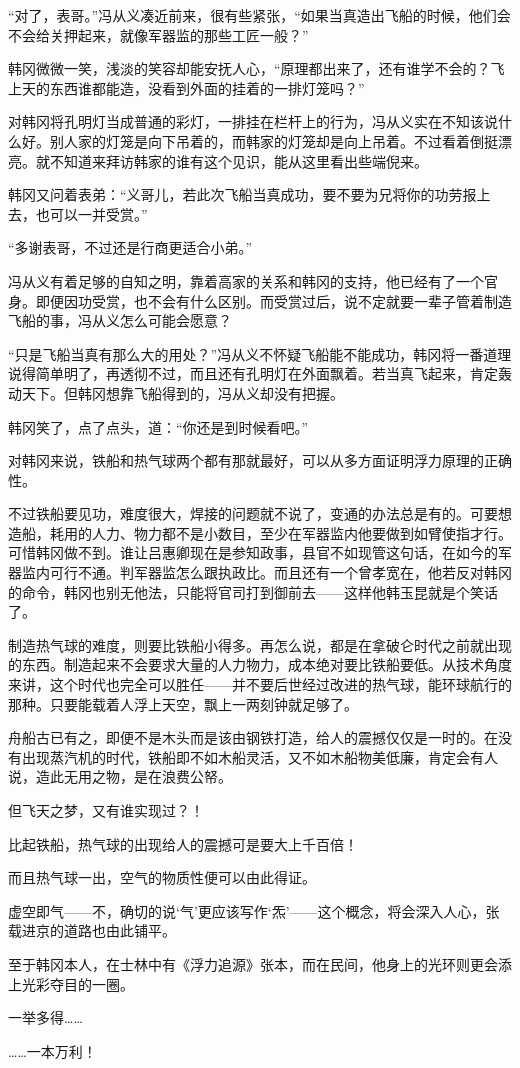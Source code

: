 “对了，表哥。”冯从义凑近前来，很有些紧张，“如果当真造出飞船的时候，他们会不会给关押起来，就像军器监的那些工匠一般？”

韩冈微微一笑，浅淡的笑容却能安抚人心，“原理都出来了，还有谁学不会的？飞上天的东西谁都能造，没看到外面的挂着的一排灯笼吗？”

对韩冈将孔明灯当成普通的彩灯，一排挂在栏杆上的行为，冯从义实在不知该说什么好。别人家的灯笼是向下吊着的，而韩家的灯笼却是向上吊着。不过看着倒挺漂亮。就不知道来拜访韩家的谁有这个见识，能从这里看出些端倪来。

韩冈又问着表弟：“义哥儿，若此次飞船当真成功，要不要为兄将你的功劳报上去，也可以一并受赏。”

“多谢表哥，不过还是行商更适合小弟。”

冯从义有着足够的自知之明，靠着高家的关系和韩冈的支持，他已经有了一个官身。即便因功受赏，也不会有什么区别。而受赏过后，说不定就要一辈子管着制造飞船的事，冯从义怎么可能会愿意？

“只是飞船当真有那么大的用处？”冯从义不怀疑飞船能不能成功，韩冈将一番道理说得简单明了，再透彻不过，而且还有孔明灯在外面飘着。若当真飞起来，肯定轰动天下。但韩冈想靠飞船得到的，冯从义却没有把握。

韩冈笑了，点了点头，道：“你还是到时候看吧。”

对韩冈来说，铁船和热气球两个都有那就最好，可以从多方面证明浮力原理的正确性。

不过铁船要见功，难度很大，焊接的问题就不说了，变通的办法总是有的。可要想造船，耗用的人力、物力都不是小数目，至少在军器监内他要做到如臂使指才行。可惜韩冈做不到。谁让吕惠卿现在是参知政事，县官不如现管这句话，在如今的军器监内可行不通。判军器监怎么跟执政比。而且还有一个曾孝宽在，他若反对韩冈的命令，韩冈也别无他法，只能将官司打到御前去——这样他韩玉昆就是个笑话了。

制造热气球的难度，则要比铁船小得多。再怎么说，都是在拿破仑时代之前就出现的东西。制造起来不会要求大量的人力物力，成本绝对要比铁船要低。从技术角度来讲，这个时代也完全可以胜任——并不要后世经过改进的热气球，能环球航行的那种。只要能载着人浮上天空，飘上一两刻钟就足够了。

舟船古已有之，即便不是木头而是该由钢铁打造，给人的震撼仅仅是一时的。在没有出现蒸汽机的时代，铁船即不如木船灵活，又不如木船物美低廉，肯定会有人说，造此无用之物，是在浪费公帑。

但飞天之梦，又有谁实现过？！

比起铁船，热气球的出现给人的震撼可是要大上千百倍！

而且热气球一出，空气的物质性便可以由此得证。

虚空即气——不，确切的说‘气’更应该写作‘炁’——这个概念，将会深入人心，张载进京的道路也由此铺平。

至于韩冈本人，在士林中有《浮力追源》张本，而在民间，他身上的光环则更会添上光彩夺目的一圈。

一举多得……

……一本万利！

